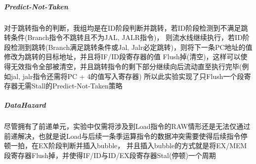 \subparagraph{Predict-Not-Taken}
对于跳转指令的判断，我组均是在ID阶段判断并跳转，若ID阶段检测到不满足跳转条件(Branch指令不跳转且不为JAL, JALR指令)，
则流水线继续执行，若ID阶段检测到跳转(Branch满足跳转条件或Jal, Jalr必定跳转)，则将下一条PC地址的值修改为跳转的目标地址，并且将IF/ID段寄存器的值
Flush掉(清空)，这样可以使得无效指令全部被清空，并且跳转指令的剩下部分继续向后流动直至执行完毕(例如jal, jalr指令还需将PC + 4的值写入寄存器)
所以此实验实现了只Flush一个段寄存器无需Stall的Predict-Not-Taken策略

\subparagraph{DataHazard}
尽管拥有了前递单元，实验中仅需将涉及到Load指令的RAW情形还是无法仅通过前递解决，也就是说Load与后续一条季运算指令的数据冲突需要使得后续指令停顿一拍，在EX阶段判断并插入bubble，
并且插入bubble的方式就是将EX/MEM段寄存器Flush掉，并使得IF/ID与ID/EX段寄存器Stal(停顿)一个周期
